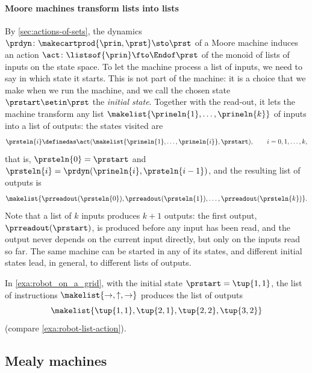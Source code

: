\paragraph{Moore machines transform lists into lists}
By \cref{sec:actions-of-sets}, the dynamics $\prdyn \colon \makecartprod{\prin, \prst} \sto \prst$ of a Moore machine induces an action $\act \colon \listsof{\prin} \fto \Endof\prst$ of the monoid of lists of inputs on the state space.
To let the machine process a list of inputs, we need to say in which state it starts.
This is not part of the machine: it is a choice that we make when we run the machine, and we call the chosen state $\prstart \setin \prst$ the \emph{initial state}.
Together with the read-out, it lets the machine transform any list $\makelist{\prineln{1}, \dots, \prineln{k}}$ of inputs into a list of outputs:
the states visited are
\begin{equation}
    \prsteln{i} \definedas \act(\makelist{\prineln{1}, \dots, \prineln{i}}, \prstart), \qquad i = 0, 1, \dots, k,
\end{equation}
that is, $\prsteln{0} = \prstart$ and $\prsteln{i} = \prdyn(\prineln{i}, \prsteln{i-1})$, and the resulting list of outputs is
\begin{equation}
    \label{eq:moore-list-output}
    \makelist{\prreadout(\prsteln{0}), \prreadout(\prsteln{1}), \dots, \prreadout(\prsteln{k})}.
\end{equation}
Note that a list of $k$ inputs produces $k+1$ outputs: the first output, $\prreadout(\prstart)$, is produced before any input has been read, and the output never depends on the current input directly, but only on the inputs read so far.
The same machine can be started in any of its states, and different initial states lead, in general, to different lists of outputs.

\begin{example}
    In \cref{exa:robot_on_a_grid}, with the initial state $\prstart = \tup{1,1}$, the list of instructions $\makelist{\rightarrow, \uparrow, \rightarrow}$ produces the list of outputs
    \begin{equation*}
        \makelist{\tup{1,1}, \tup{2,1}, \tup{2,2}, \tup{3,2}}
    \end{equation*}
    (compare \cref{exa:robot-list-action}).
\end{example}



\subsection{Mealy machines}
\label{sec:mealy-machines}

